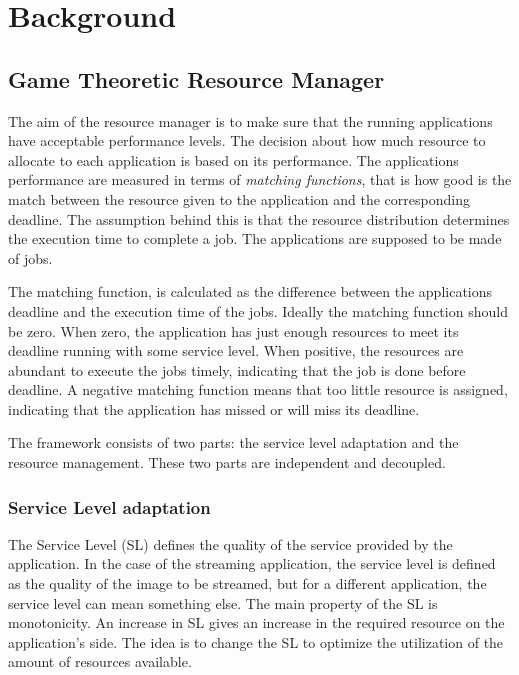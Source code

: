 \documentclass[nobiblatex]{LTHthesis}
\begin{document}
\chapter{Background}
\label{chp:background}

\section{Game Theoretic Resource Manager}

The aim of the resource manager is to make sure that the running applications
have acceptable performance levels. The decision about how much resource to
allocate to each application is based on its performance. The applications
performance are measured in terms of \emph{matching functions}, that is how
good is the match between the resource given to the application and the
corresponding deadline. The assumption behind this is that the resource
distribution determines the execution time to complete a job. The applications
are supposed to be made of jobs. 

The matching function, is calculated as the difference between the
applications deadline and the execution time of the jobs. Ideally the matching
function should be zero. When zero, the application has just enough resources
to meet its deadline running with some service level. When positive, the
resources are abundant to execute the jobs timely, indicating that the job
is done before deadline. A negative matching function means that too little
resource is assigned, indicating that the application has missed or will miss
its deadline.

The framework consists of two parts: the service level adaptation and the
resource management. These two parts are independent and decoupled.

\subsection{Service Level adaptation}

The Service Level (SL) defines the quality of the service provided by the 
application. In the case of the streaming application, the service level
is defined as the quality of the image to be streamed, but for a different
application, the service level can mean something else. The main property of
the SL is monotonicity. An increase in SL gives an increase in the required
resource on the application's side. The idea is to change the SL to optimize
the utilization of the amount of resources available. 
\end{document}

